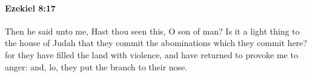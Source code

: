 
		\paragraph{Ezekiel 8:17} %
			\label{EZEKIEL-8-17}

			Then he said unto me, Hast thou seen this, O son of man? Is it a light thing to the house of Judah that they commit the abominations which they commit here? for they have filled the land with violence, and have returned to provoke me to anger: and, lo, they put the branch to their nose.


